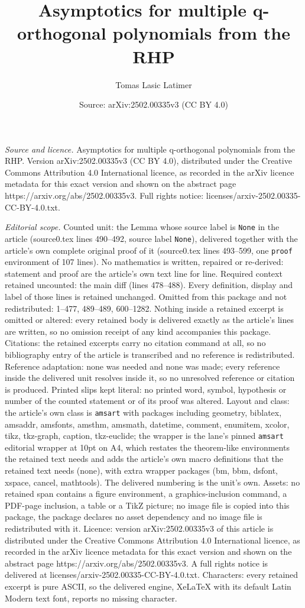 \documentclass[10pt,a4paper]{amsart}
\title[Asymptotics for multiple q-orthogonal polynomials from the R]{Asymptotics for multiple q-orthogonal polynomials from the RHP}
\author{Tomas Lasic Latimer}
\date{Source: arXiv:2502.00335v3 (CC BY 4.0)}
\begin{document}
\maketitle

\noindent\emph{Source and licence.} Asymptotics for multiple q-orthogonal polynomials from the RHP. Version arXiv:2502.00335v3 (CC BY 4.0), distributed under the Creative Commons Attribution 4.0 International licence, as recorded in the arXiv licence metadata for this exact version and shown on the abstract page https://arxiv.org/abs/2502.00335v3. Full rights notice: licenses/arxiv-2502.00335-CC-BY-4.0.txt.\par\smallskip

\noindent\textit{Editorial scope.} Counted unit: the Lemma whose source label is \texttt{None} in the article (source0.tex lines 490--492, source label \texttt{None}), delivered together with the article's own complete original proof of it (source0.tex lines 493--599, one \texttt{proof} environment of 107 lines). No mathematics is written, repaired or re-derived: statement and proof are the article's own text line for line. Required context retained uncounted: the main diff (lines 478--488). Every definition, display and label of those lines is retained unchanged. Omitted from this package and not redistributed: 1--477, 489--489, 600--1282. Nothing inside a retained excerpt is omitted or altered: every retained body is delivered exactly as the article's lines are written, so no omission receipt of any kind accompanies this package. Citations: the retained excerpts carry no citation command at all, so no bibliography entry of the article is transcribed and no reference is redistributed. Reference adaptation: none was needed and none was made; every reference inside the delivered unit resolves inside it, so no unresolved reference or citation is produced. Printed slips kept literal: no printed word, symbol, hypothesis or number of the counted statement or of its proof was altered. Layout and class: the article's own class is \texttt{amsart} with packages including geometry, biblatex, amsaddr, amsfonts, amsthm, amsmath, datetime, comment, enumitem, xcolor, tikz, tkz-graph, caption, tkz-euclide; the wrapper is the lane's pinned \texttt{amsart} editorial wrapper at 10pt on A4, which restates the theorem-like environments the retained text needs and adds the article's own macro definitions that the retained text needs (none), with extra wrapper packages (bm, bbm, dsfont, xspace, cancel, mathtools). The delivered numbering is the unit's own. Assets: no retained span contains a figure environment, a graphics-inclusion command, a PDF-page inclusion, a table or a TikZ picture; no image file is copied into this package, the package declares no asset dependency and no image file is redistributed with it. Licence: version arXiv:2502.00335v3 of this article is distributed under the Creative Commons Attribution 4.0 International licence, as recorded in the arXiv licence metadata for this exact version and shown on the abstract page https://arxiv.org/abs/2502.00335v3. A full rights notice is delivered at licenses/arxiv-2502.00335-CC-BY-4.0.txt. Characters: every retained excerpt is pure ASCII, so the delivered engine, XeLaTeX with its default Latin Modern text font, reports no missing character.
\end{document}
